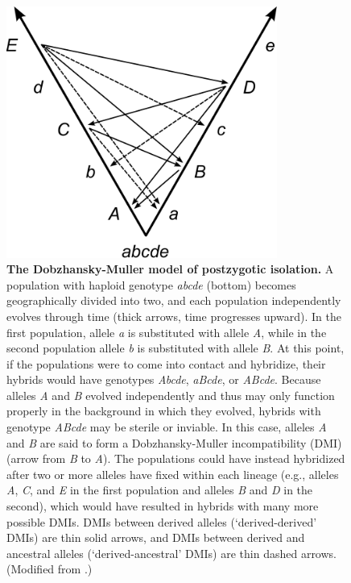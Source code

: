\begin{doublespace}
\begin{figure}
\begin{center}
\includegraphics[width=3.5in]{dm-model.pdf}
\end{center}
\caption{\textbf{The Dob\-zhan\-sky-Mul\-ler model of postzygotic isolation.}
%
A population with haploid genotype \emph{abcde} (bottom)
becomes geographically divided into two,
and each population independently evolves through time
(thick arrows, time progresses upward).
%
In the first population,
allele \emph{a} is substituted with allele \emph{A},
while in the second population
allele \emph{b} is substituted with allele \emph{B}.
%
At this point, if the populations were to come into contact and hybridize,
their hybrids would have genotypes
\emph{Abcde}, \emph{aBcde}, or \emph{ABcde}.
%
Because alleles \emph{A} and \emph{B}
evolved independently and thus may only function properly
in the background in which they evolved,
hybrids with genotype \emph{ABcde} may be sterile or inviable.
%
In this case, alleles \emph{A} and \emph{B} are said to form a
Dob\-zhan\-sky-Mul\-ler incompatibility (DMI)
(arrow from \emph{B} to \emph{A}).
%
The populations could have instead hybridized
after two or more alleles have fixed within each lineage
(e.g., alleles \emph{A}, \emph{C}, and \emph{E} in the first population
and alleles \emph{B} and \emph{D} in the second),
which would have resulted in hybrids with many more possible DMIs.
%
DMIs between derived alleles (`derived-derived' DMIs) are thin solid arrows,
and DMIs between derived and ancestral alleles (`derived-ancestral' DMIs)
are thin dashed arrows.
%
(Modified from \citep{orr95}.)}
\label{dm-model}
\end{figure}





\end{doublespace}
